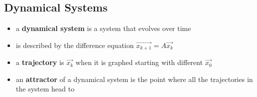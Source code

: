 \documentclass[a4paper,12pt]{article}
\theoremstyle{definition}
\theoremstyle{definition}
\begin{document}
	\subsection{Dynamical Systems}
	\begin{itemize}
		\item a \textbf{dynamical system} is a system that evolves over time
		
		\item is described by the difference equation $\vec{x_{k + 1}} = A\vec{x_k}$
		
		\item a \textbf{trajectory} is $\vec{x_k}$ when it is graphed starting with different $\vec{x_0}$
		
		\item an \textbf{attractor} of a dynamical system is the point where all the trajectories in the system head to
	\end{itemize}
	
\end{document}
